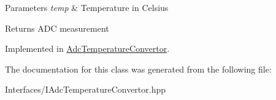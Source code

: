 \begin{DoxyParams}{Parameters}
{\em temp} & Temperature in Celsius \\
\hline
\end{DoxyParams}
\begin{DoxyReturn}{Returns}
A\+DC measurement 
\end{DoxyReturn}


Implemented in \hyperlink{class_adc_temperature_convertor_ae82f374826a431c837bdf796c593775b}{Adc\+Temperature\+Convertor}.



The documentation for this class was generated from the following file\+:\begin{DoxyCompactItemize}
\item 
Interfaces/I\+Adc\+Temperature\+Convertor.\+hpp\end{DoxyCompactItemize}
